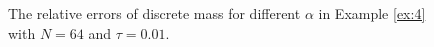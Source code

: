 \documentclass[preprint,compress,3p,10pt,fleqn]{elsarticle}
\numberwithin{equation}{section}
\begin{document}
\begin{figure}[H]
\begin{center}
 \caption{The relative errors of discrete mass for different $\alpha$ in Example \ref{ex:4} with $N = 64$ and $\tau=0.01$.} \label{fig:11}
\end{center}
\end{figure}
\end{document}
